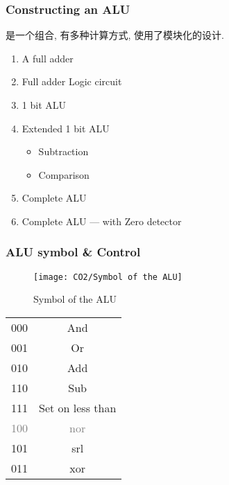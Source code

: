 \subsubsection{Constructing an ALU}
是一个组合, 有多种计算方式, 使用了模块化的设计. 

\begin{enumerate}
    \item A full adder
    \item Full adder Logic circuit
    \item 1 bit ALU
    \item Extended 1 bit ALU
    \begin{itemize}
        \item Subtraction
        \item Comparison
    \end{itemize}
    \item Complete ALU
    \item Complete ALU --- with Zero detector
\end{enumerate}

\subsubsection{ALU symbol \& Control}
\begin{figure}[H]
    \centering
    \texttt{[image: CO2/Symbol of the ALU]}
    \caption{Symbol of the ALU}
\end{figure}

\begin{center}
    \tabletail{\hline}
    \tablelasttail{\hline}
    \begin{supertabular}{|c|c|}
        000 & And \\
        001 & Or \\
        010 & Add \\
        110 & Sub \\
        111 & Set on less than \\
        \textcolor{gray}{100} & \textcolor{gray}{nor} \\
        101 & srl \\
        011 & xor \\ \hline
    \end{supertabular}
\end{center}



